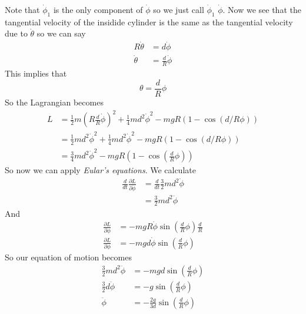 \documentclass[11pt]{article}
\numberwithin{equation}{section}
\begin{document}
Note that $\dot{\phi}_1$ is the only component of $\dot{\phi}$ so we just call $\dot{\phi}_1$ $\dot{\phi}$. Now we see that the tangential velocity of the insidide cylinder is the same as the tangential velocity due to $\dot{\theta}$ so we can say
\begin{align*}
R\dot{\theta} &=   d\dot{\phi}\\
\dot{\theta} &=   \frac{d}{R}\dot{\phi}
\end{align*}
This implies that
$$\theta = \frac{d}{R}\phi$$
So the Lagrangian becomes 
\begin{align*}
L &= \frac{1}{2}m(R\frac{d}{R}\dot{\phi})^2 + \frac{1}{4}md^2\dot{\phi}^2 - mgR(1-\cos(d/R\phi))\\
 &= \frac{1}{2}md^2\dot{\phi}^2 + \frac{1}{4}md^2\dot{\phi}^2 - mgR(1-\cos(d/R\phi))\\
 &= \frac{3}{4}md^2\dot{\phi}^2 - mgR\left(1-\cos\left(\frac{d}{R}\phi\right)\right)
\end{align*}
So now we can apply \emph{Eular's equations}. We calculate 
\begin{align*}
\frac{d}{dt}\frac{\partial L}{\partial \dot{\phi}} &= \frac{d}{dt}\frac{3}{2}md^2\dot{\phi}\\
&= \frac{3}{2}md^2\ddot{\phi}
\end{align*}
And
\begin{align*}
\frac{\partial L}{\partial \phi} &= -mgR\dot{\phi}\sin\left(\frac{d}{R}\phi\right)\frac{d}{R}\\
\frac{\partial L}{\partial \phi} &= -mgd\dot{\phi}\sin\left(\frac{d}{R}\phi\right)
\end{align*}
So our equation of motion becomes
\begin{align*}
\frac{3}{2}md^2\ddot{\phi}  &= -mgd\sin\left(\frac{d}{R}\phi\right) \\
\frac{3}{2}d\ddot{\phi} &= -g\sin\left(\frac{d}{R}\phi\right) \\
\ddot{\phi} &= -\frac{2g}{3d}\sin\left(\frac{d}{R}\phi\right) 
\end{align*}
\end{document}
